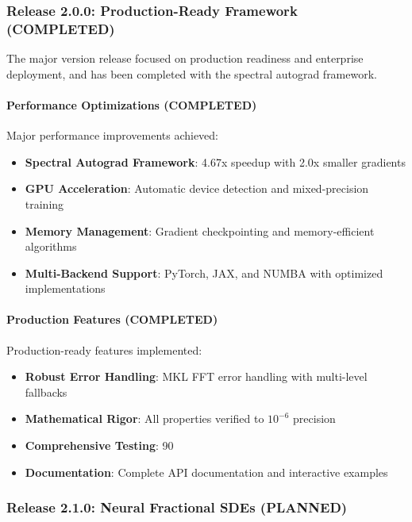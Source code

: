 \subsubsection{Release 2.0.0: Production-Ready Framework (COMPLETED)}

The major version release focused on production readiness and enterprise deployment, and has been completed with the spectral autograd framework.

\paragraph{Performance Optimizations (COMPLETED)}
Major performance improvements achieved:

\begin{itemize}
    \item \textbf{Spectral Autograd Framework}: 4.67x speedup with 2.0x smaller gradients
    \item \textbf{GPU Acceleration}: Automatic device detection and mixed-precision training
    \item \textbf{Memory Management}: Gradient checkpointing and memory-efficient algorithms
    \item \textbf{Multi-Backend Support}: PyTorch, JAX, and NUMBA with optimized implementations
\end{itemize}

\paragraph{Production Features (COMPLETED)}
Production-ready features implemented:

\begin{itemize}
    \item \textbf{Robust Error Handling}: MKL FFT error handling with multi-level fallbacks
    \item \textbf{Mathematical Rigor}: All properties verified to $10^{-6}$ precision
    \item \textbf{Comprehensive Testing}: 90%
    \item \textbf{Documentation}: Complete API documentation and interactive examples
\end{itemize}

\subsubsection{Release 2.1.0: Neural Fractional SDEs (PLANNED)}

